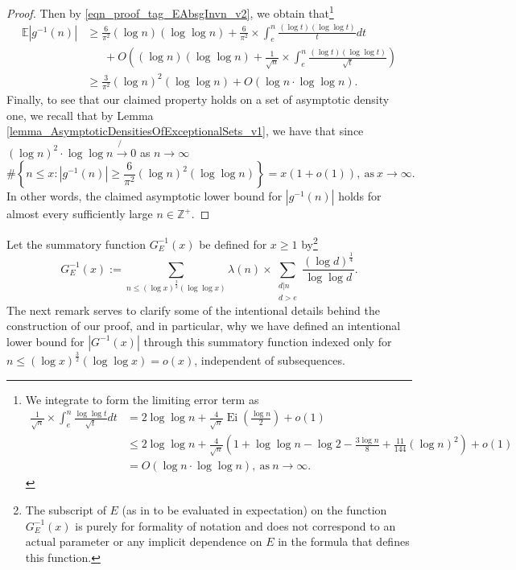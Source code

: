\documentclass[11pt,reqno,a4letter]{article}
\numberwithin{figure}{section}
\numberwithin{table}{section}
\theoremstyle{plain}
\numberwithin{theorem}{section}
\theoremstyle{definition}
\begin{document}
\begin{proof}
Then by \eqref{eqn_proof_tag_EAbsgInvn_v2}, we obtain that\footnote{ 
     We integrate to form the limiting error term as 
     \begin{align*} 
     \frac{1}{\sqrt{n}} \times \int_{e}^{n} \frac{\log\log t}{\sqrt{t}} dt & = 
          2 \log\log n + \frac{4}{\sqrt{n}} \operatorname{Ei}\left(\frac{\log n}{2}\right) + o(1) \\ 
          & \leq 2 \log\log n + 
          \frac{4}{\sqrt{n}} \left(1 + \log\log n - \log 2 - \frac{3\log n}{8} + 
          \frac{11}{144} (\log n)^2 
          \right) + o(1) \\ 
          & = O(\log n \cdot \log\log n), \mathrm{\ as\ } n \rightarrow \infty. 
     \end{align*} 
}
\begin{align*} 
\mathbb{E}|g^{-1}(n)| & \geq \frac{6}{\pi^2} (\log n) (\log\log n) + 
     \frac{6}{\pi^2} \times \int_{e}^{n} 
     \frac{(\log t) (\log\log t)}{t} dt \\ 
     & \phantom{\geq\ } + 
     O\left((\log n) (\log\log n) + \frac{1}{\sqrt{n}} \times 
     \int_{e}^{n} \frac{(\log t) (\log\log t)}{\sqrt{t}}\right) \\ 
     & \geq \frac{3}{\pi^2} (\log n)^2 (\log\log n) + O(\log n \cdot \log\log n). 
\end{align*} 
Finally, to see that our claimed property 
holds on a set of asymptotic density one, we recall that by 
Lemma \ref{lemma_AsymptoticDensitiesOfExceptionalSets_v1}, 
we have that since $(\log n)^2 \cdot \log\log n \not{\rightarrow} 0$ as $n \rightarrow \infty$ 
\begin{equation} 
\label{eqn_proof_tag_DensityOfgInvnNearExpectation_v3} 
\#\left\{n \leq x: |g^{-1}(n)| \geq \frac{6}{\pi^2} (\log n)^2 (\log\log n)\right\} = 
     x(1 + o(1)), \mathrm{\ as\ } x \rightarrow \infty. 
\end{equation} 
In other words, the claimed asymptotic lower bound for $|g^{-1}(n)|$ holds for almost every 
sufficiently large $n \in \mathbb{Z}^{+}$. 
\end{proof} 

Let the summatory function $G_E^{-1}(x)$ be defined for $x \geq 1$ by\footnote{ 
     The subscript of $E$ (as in to be evaluated in expectation) 
     on the function $G_E^{-1}(x)$ is purely for formality of 
     notation and does not correspond to 
     an actual parameter or any implicit dependence on $E$ in the formula 
     that defines this function. 
}
\begin{equation} 
\label{eqn_GEInvxSummatoryFuncDef_v1} 
G_E^{-1}(x) := \sum_{n \leq (\log x)^{\frac{3}{2}} (\log\log x)} \lambda(n) \times 
     \sum_{\substack{d|n \\ d > e}} \frac{(\log d)^{\frac{1}{4}}}{\log\log d}. 
\end{equation} 
The next remark serves to clarify some of the intentional details behind the construction of 
our proof, and in particular, why we have defined an intentional lower bound for $|G^{-1}(x)|$ 
through this summatory function indexed only for 
$n \leq (\log x)^{\frac{3}{2}} (\log\log x) = o(x)$, independent of subsequences. 
\end{document}
